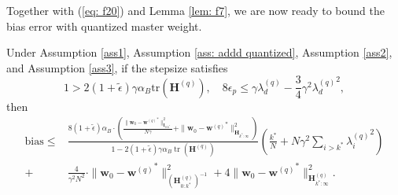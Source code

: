 \documentclass[11pt, letterpaper]{article}
\begin{document}
Together with (\ref{eq: f20}) and Lemma \ref{lem: f7}, we are now ready to bound the bias error with quantized master weight.

\begin{lemma}
    \label{bias R2 bound multiplicative, master}
    Under Assumption \ref{ass1}, Assumption \ref{ass: addd quantized}, Assumption \ref{ass2}, and Assumption \ref{ass3}, if the stepsize satisfies 
    \begin{equation*}
        1>2(1+\tilde{\epsilon})\gamma\alpha_B\mathrm{tr}(\mathbf{H}^{(q)}),\quad 8\epsilon_p\leq \gamma \lambda_d^{(q)}-\frac{3}{4}\gamma^2{\lambda_d^{(q)}}^2,
    \end{equation*}
    then
    \begin{equation*}
        \begin{aligned}
            \mathrm{bias}
            \leq& \frac{8(1+\tilde{\epsilon})\alpha_B\cdot\left(\frac{\|\mathbf{w}_{0}-{\mathbf{w}^{(q)}}^{*}\|_{\mathbf{I}_{0:k^{*}}}^{2}}{N\gamma}+\|\mathbf{w}_{0}-{\mathbf{w}^{(q)}}^{*}\|_{\mathbf{H}_{k^{*}:\infty}}^{2}\right)}{1-2(1+\tilde{\epsilon})\gamma\alpha_B\operatorname{tr}(\mathbf{H}^{(q)})}\left(\frac{k^*}{N} + {N\gamma^2}\sum_{i> k^*}{\lambda_i^{(q)}}^2\right)\\
            +& \frac{4}{\gamma^2N^2}\cdot\|\mathbf{w}_0-{\mathbf{w}^{(q)}}^*\|_{(\mathbf{H}_{0:k^*}^{(q)})^{-1}}^2+4\|\mathbf{w}_0-{\mathbf{w}^{(q)}}^*\|_{\mathbf{H}_{{k^*}:\infty}^{(q)}}^2.
        \end{aligned}
    \end{equation*}
\end{lemma}
\end{document}
